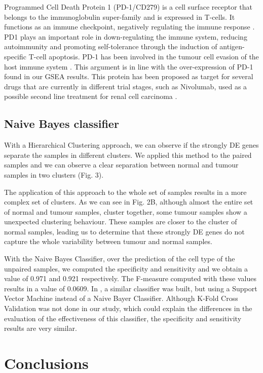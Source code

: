 \documentclass[9pt,twocolumn,twoside]{gsajnl}
\begin{document}
Programmed Cell Death Protein 1 (PD-1/CD279) is a cell surface receptor that belongs to the immunoglobulin super-family and is expressed in T-cells. It functions as an immune checkpoint, negatively regulating the immune response \citep{Francisco2010}. PD1 plays an important role in down-regulating the immune system, reducing autoimmunity and promoting self-tolerance through the induction of antigen-specific T-cell apoptosis.
PD-1 has been involved in the tumour cell evasion of the host immune system \citep{Iwai2002}. This argument is in line with the over-expression of PD-1 found in our GSEA results. This protein has been proposed as target for several drugs that are currently in different trial stages, such as Nivolumab, used as a possible second line treatment for renal cell carcinoma \citep{nivolumab}.


\subsection*{Naive Bayes classifier}
With a Hierarchical Clustering approach, we can observe if the strongly DE genes separate the samples in different clusters. We applied this method to the paired samples and we can observe a clear separation between normal and tumour samples in two clusters (Fig. 3). 

The application of this approach to the whole set of samples results in a more complex set of clusters. As we can see in Fig. 2B, although almost the entire set of normal and tumour samples, cluster together, some tumour samples show a unexpected clustering behaviour. These samples are closer to the cluster of normal samples, leading us to determine that these strongly DE genes do not capture the whole variability between tumour and normal samples.

With the Naive Bayes Classifier, over the prediction of the cell type of the unpaired samples, we computed the specificity and sensitivity and we obtain a value of 0.971 and 0.921 respectively. The F-measure computed with these values results in a value of 0.0609. In  \citealt{Yang2014} , a similar classifier was built, but using a Support Vector Machine instead of a Naive Bayer Classifier. Although K-Fold Cross Validation was not done in our study, which could explain the differences in the evaluation of the effectiveness of this classifier, the specificity and sensitivity results are very similar.

\section*{Conclusions}
\end{document}
